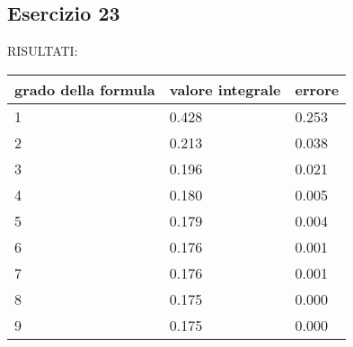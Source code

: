 \subsection{Esercizio 23}


RISULTATI:

\begin{table}[h]
    \begin{tabular}{|l l l|}
        \hline
        grado della formula & valore integrale & errore\\
        \hline
        1 & 0.428 & 0.253\\
        2 & 0.213 & 0.038\\
        3 & 0.196 & 0.021\\
        4 & 0.180 & 0.005\\
        5 & 0.179 & 0.004\\
        6 & 0.176 & 0.001\\
        7 & 0.176 & 0.001\\
        8 & 0.175 & 0.000\\
        9 & 0.175 & 0.000\\
        \hline
    \end{tabular}
\end{table}
   
